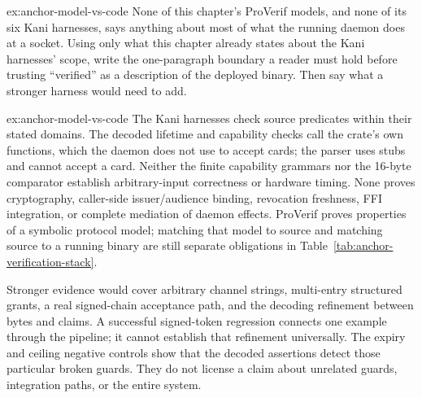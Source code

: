 \documentclass[11pt,a4paper]{article}
\theoremstyle{definition}
\begin{document}
\begin{pdexercise}[kind=Open,rating=3]{ex:anchor-model-vs-code}
None of this chapter's ProVerif models, and none of its six Kani harnesses, says anything about most of what the running daemon does at a socket. Using only what this chapter already states about the Kani harnesses' scope, write the one-paragraph boundary a reader must hold before trusting ``verified'' as a description of the deployed binary. Then say what a stronger harness would need to add.
\end{pdexercise}
\begin{pdsolution}{ex:anchor-model-vs-code}
The Kani harnesses check source predicates within their stated domains.
The decoded lifetime and capability checks call the crate's own functions, which the daemon does not use to accept cards; the
parser uses stubs and cannot accept a card. Neither the finite capability
grammars nor the 16-byte comparator establish arbitrary-input correctness
or hardware timing. None proves cryptography, caller-side issuer/audience
binding, revocation freshness, FFI integration, or complete mediation of
daemon effects. ProVerif proves properties of a symbolic protocol model;
matching that model to source and matching source to a running binary are
still separate obligations in Table~\ref{tab:anchor-verification-stack}.

Stronger evidence would cover arbitrary channel strings, multi-entry
structured grants, a real signed-chain acceptance path, and the decoding
refinement between bytes and claims. A successful signed-token regression
connects one example through the pipeline; it cannot establish that
refinement universally. The expiry and ceiling negative controls show that
the decoded assertions detect those particular broken guards. They do not
license a claim about unrelated guards, integration paths, or the entire
system.
\end{pdsolution}

\end{document}
